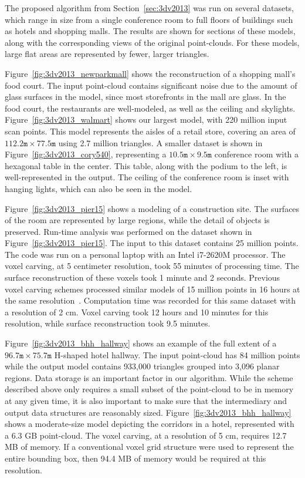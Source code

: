 \documentclass[12pt,onecolumn,oneside]{book}
\begin{document}
The proposed algorithm from Section~\ref{sec:3dv2013} was run on several datasets, which range in size from a single conference room to full floors of buildings such as hotels and shopping malls.  The results are shown for sections of these models, along with the corresponding views of the original point-clouds.  For these models, large flat areas are represented by fewer, larger triangles.

Figure~\ref{fig:3dv2013_newparkmall} shows the reconstruction of a shopping mall's food court.  The input point-cloud contains significant noise due to the amount of glass surfaces in the model, since most storefronts in the mall are glass.  In the food court, the restaurants are well-modeled, as well as the ceiling and skylights.  Figure~\ref{fig:3dv2013_walmart} shows our largest model, with 220 million input scan points.  This model represents the aisles of a retail store, covering an area of $112.2\texttt{m} \times 77.5\texttt{m}$ using 2.7 million triangles.  A smaller dataset is shown in Figure~\ref{fig:3dv2013_cory540}, representing a $10.5\texttt{m} \times 9.5\texttt{m}$ conference room with a hexagonal table in the center.  This table, along with the podium to the left, is well-represented in the output.  The ceiling of the conference room is inset with hanging lights, which can also be seen in the model.  

Figure~\ref{fig:3dv2013_pier15} shows a modeling of a construction site.  The surfaces of the room are represented by large regions, while the detail of objects is preserved.  Run-time analysis was performed on the dataset shown in Figure~\ref{fig:3dv2013_pier15}.  The input to this dataset contains 25 million points.  The code was run on a personal laptop with an Intel i7-2620M processor.  The voxel carving, at 5 centimeter resolution, took 55 minutes of processing time.  The surface reconstruction of these voxels took 1 minute and 2 seconds.  Previous voxel carving schemes processed similar models of 15 million points in 16 hours at the same resolution~\cite{Carving}.  Computation time was recorded for this same dataset with a resolution of 2 cm.  Voxel carving took 12 hours and 10 minutes for this resolution, while surface reconstruction took 9.5 minutes.

Figure~\ref{fig:3dv2013_bhh_hallway} shows an example of the full extent of a $96.7\texttt{m} \times 75.7\texttt{m}$ H-shaped hotel hallway.  The input point-cloud has 84 million points while the output model contains 933,000 triangles grouped into 3,096 planar regions.  Data storage is an important factor in our algorithm.  While the scheme described above only requires a small subset of the point-cloud to be in memory at any given time, it is also important to make sure that the intermediary and output data structures are reasonably sized.  Figure~\ref{fig:3dv2013_bhh_hallway} shows a moderate-size model depicting the corridors in a hotel, represented with a 6.3 GB point-cloud.  The voxel carving, at a resolution of 5 cm, requires 12.7 MB of memory.  If a conventional voxel grid structure were used to represent the entire bounding box, then 94.4 MB of memory would be required at this resolution.
\end{document}

